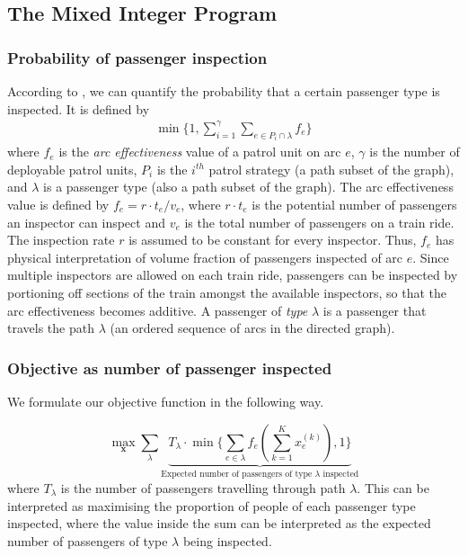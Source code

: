 \documentclass[11pt]{article}
\begin{document}
\subsection{The Mixed Integer Program}

\subsubsection{Probability of passenger inspection}

According to \cite{jiang_sandholm_2012, mastersthesis, yin_sullivan_2012}, we can quantify the probability that a certain passenger type is inspected. It is defined by
\begin{align}
    \min\bigg\{1,\sum_{i=1}^\gamma\sum_{e\in P_i\cap\lambda} f_e\bigg\}
\end{align}
where $f_e$ is the \textit{arc effectiveness} value of a patrol unit on arc $e$, $\gamma$ is the number of deployable patrol units, $P_i$ is the $i^{th}$ patrol strategy (a path subset of the graph), and $\lambda$ is a passenger type (also a path subset of the graph). The arc effectiveness value is defined by $f_e = r\cdot t_e/v_e$, where $r\cdot t_e$ is the potential number of passengers an inspector can inspect and $v_e$ is the total number of passengers on a train ride. The inspection rate $r$ is assumed to be constant for every inspector. Thus, $f_e$ has physical interpretation of volume fraction of passengers inspected of arc $e$. Since multiple inspectors are allowed on each train ride, passengers can be inspected by portioning off sections of the train amongst the available inspectors, so that the arc effectiveness becomes additive. A passenger of \textit{type} $\lambda$ is a passenger that travels the path $\lambda$ (an ordered sequence of arcs in the directed graph).

\subsubsection{Objective as number of passenger inspected}

We formulate our objective function in the following way.

\begin{equation}
\label{objectivefxn}
     \max_{\textbf{x}}\sum_{\lambda}\underbrace{T_{\lambda}\cdot\min\bigg\{\sum_{e\in\lambda}f_e\left(
        \sum_{k=1}^K x_{e}^{(k)}
    \right), 1\bigg\}}_{\text{Expected number of passengers of type $\lambda$ inspected}}
\end{equation}
where $T_\lambda$ is the number of passengers travelling through path $\lambda$. This can be interpreted as maximising the proportion of people of each passenger type inspected, where
the value inside the sum can be interpreted as the expected number of 
passengers of type $\lambda$ being inspected.
\end{document}
